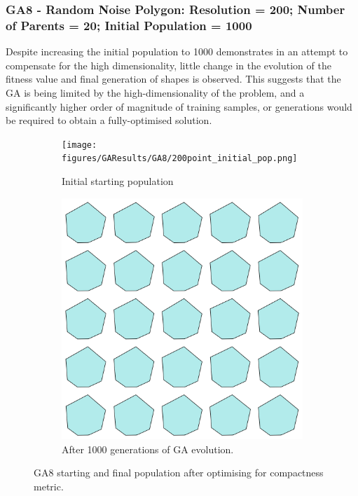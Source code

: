 \documentclass{article}
\begin{document}
\subsubsection*{GA8 - Random Noise Polygon: Resolution = 200; Number of Parents = 20; Initial Population = 1000}

Despite increasing the initial population to 1000 demonstrates in an attempt to compensate for the high dimensionality, little change in the evolution of the fitness value and final generation of shapes is observed. This suggests that the GA is being limited by the high-dimensionality of the problem, and a significantly higher order of magnitude of training samples, or generations would be required to obtain a fully-optimised solution. 

\begin{figure}[H]
    \centering
    \begin{subfigure}[b]{0.45\textwidth}
        \centering
        \texttt{[image: figures/GAResults/GA8/200point\_initial\_pop.png]}
        \caption{Initial starting population}
        \label{fig:GA8_starting}
    \end{subfigure}
    \hfill
    \begin{subfigure}[b]{0.45\textwidth}
        \centering
        \includegraphics[width=\textwidth]{figures/GAResults/GA8/1000gens_20pars_1000initpop_5pcent_mut.png}
        \caption{After 1000 generations of GA evolution.}
        \label{fig:GA8_final}
    \end{subfigure}
    \caption{GA8 starting and final population after optimising for compactness metric.}
    \label{fig:GA8_before_after_GA}
\end{figure}
\end{document}
